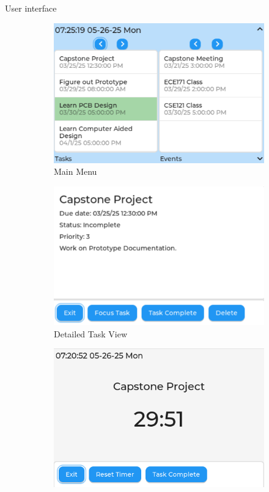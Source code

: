 \documentclass[final]{beamer}
\newlength{\colwidth}
\begin{document}
\begin{frame}[t]
\begin{columns}[t]
\begin{column}{\colwidth}
\begin{block}{User interface}
    \begin{figure}
    \centering
        \begin{subfigure}[t]{0.49\textwidth}
            \includegraphics[width=\textwidth]{taskEvent.png}
            \caption{Main Menu}
        \end{subfigure}
        \begin{subfigure}[t]{0.49\textwidth}
            \includegraphics[width=\textwidth]{taskTile.png}
            \caption{Detailed Task View}
        \end{subfigure}
        \begin{subfigure}[t]{0.49\textwidth}
            \includegraphics[width=\textwidth]{focusTile.png}

\end{subfigure}
\end{figure}
\end{block}
\end{column}
\end{columns}
\end{frame}
\end{document}

